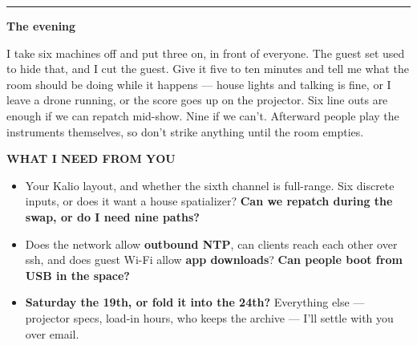 \documentclass[10pt,letterpaper]{article}
\newcommand{\specbartop}[1]{%
  \begingroup\setlength{\fboxsep}{3.4pt}%
  \colorbox{acdark}{\color{white}\bfseries\fontsize{8.6pt}{9.6pt}\selectfont #1}%
  \endgroup\vspace{0.12em}\par}
\newcommand{\bandhead}[1]{%
  {\bfseries\fontsize{13pt}{14pt}\selectfont\color{acdark}#1\par}}
\begin{document}
\vspace{0.40em}
{\color{acpink}\rule{\linewidth}{1pt}}

\vspace{0.10em}
\noindent\bandhead{The evening}
\vspace{0.16em}

\begin{center}
\end{center}

\vspace{0.06em}
\noindent
\begin{minipage}[t]{0.485\linewidth}
I take six machines off and put three on, in front of everyone. The guest set
used to hide that, and I cut the guest. Give it five to ten minutes and tell me
what the room should be doing while it happens — house lights and talking is
fine, or I leave a drone running, or the score goes up on the projector. Six
line outs are enough if we can repatch mid-show. Nine if we can't. Afterward
people play the instruments themselves, so don't strike anything until the room
empties.

\end{minipage}\hfill
\begin{minipage}[t]{0.485\linewidth}
\specbartop{WHAT I NEED FROM YOU}
\begin{itemize}
\item Your Kalio layout, and whether the sixth channel is full-range. Six discrete inputs, or does it want a house spatializer? \textbf{Can we repatch during the swap, or do I need nine paths?}
\item Does the network allow \textbf{outbound NTP}, can clients reach each other over ssh, and does guest Wi-Fi allow \textbf{app downloads}? \textbf{Can people boot from USB in the space?}
\item \textbf{Saturday the 19th, or fold it into the 24th?} Everything else — projector specs, load-in hours, who keeps the archive — I'll settle with you over email.
\end{itemize}
\end{minipage}
\end{document}
